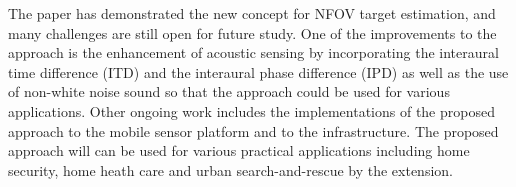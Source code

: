The paper has demonstrated the new concept for NFOV target estimation, and many challenges are still open for future study.  One of the improvements to the approach is the enhancement of acoustic sensing by incorporating the interaural time difference (ITD) and the interaural phase difference (IPD) as well as the use of non-white noise sound so that the approach could be used for various applications.  Other ongoing work includes the implementations of the proposed approach to the mobile sensor platform and to the infrastructure.  The proposed approach will can be used for various practical applications including home security, home heath care and urban search-and-rescue by the extension.  

